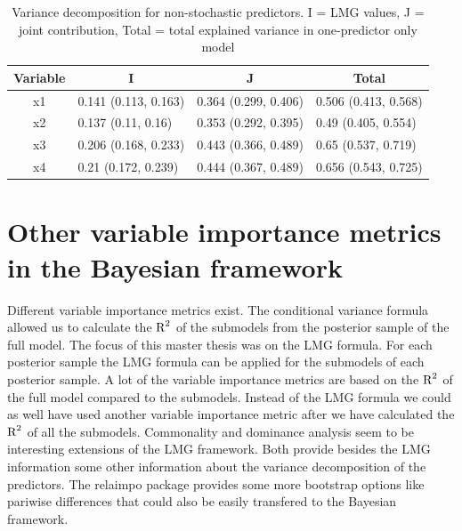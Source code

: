 \documentclass[11pt,a4paper,twoside]{book}\usepackage[]{graphicx}\usepackage[]{color}
\begin{document}
\begin{table}[h]
\caption{Variance decomposition for non-stochastic predictors. I = LMG values, J = joint contribution, Total = total explained variance in one-predictor only model}
\centering
\begin{tabular}{clll}
  \toprule
  \multicolumn{1}{c}{\textbf{Variable}} & \multicolumn{1}{c}{\textbf{I}} &\multicolumn{1}{c}{\textbf{J}} & \multicolumn{1}{c}{\textbf{Total}} \\
  \hline
x1 & 0.141 (0.113, 0.163)  & 0.364 (0.299, 0.406)   & 0.506 (0.413, 0.568)  \\ 
x2 & 0.137 (0.11, 0.16)  & 0.353 (0.292, 0.395)   & 0.49 (0.405, 0.554)  \\ 
x3 & 0.206 (0.168, 0.233)  & 0.443 (0.366, 0.489)   & 0.65 (0.537, 0.719)  \\ 
x4 & 0.21 (0.172, 0.239)  & 0.444 (0.367, 0.489)   & 0.656 (0.543, 0.725)  \\ 
   \bottomrule
\end{tabular}
\label{tbl:repeated.unstructured}
\end{table}











\chapter{Other variable importance metrics in the Bayesian framework}

Different variable importance metrics exist. The conditional variance formula allowed us to calculate the $\text{R}^2$ of the submodels from the posterior sample of the full model. The focus of this master thesis was on the LMG formula. For each posterior sample the LMG formula can be applied for the submodels of each posterior sample. A lot of the variable importance metrics are based on the $\text{R}^2$ of the full model compared to the submodels. Instead of the LMG formula we could as well have used another variable importance metric after we have calculated the $\text{R}^2$ of all the submodels. Commonality and dominance analysis seem to be interesting extensions of the LMG framework. Both provide besides the LMG information some other information about the variance decomposition of the predictors. The relaimpo package provides some more bootstrap options like pariwise differences that could also be easily transfered to the Bayesian framework. 
\end{document}
